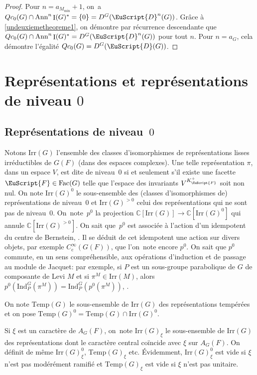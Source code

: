 \documentclass[JEP,XML,SOM,Unicode,francais]{cedram}
\let\mathcal \EuScript
\newcommand{\Ann}{\mathrm{Ann}}
\newcommand{\rc}{\mathrm{c}}
\newcommand{\Fac}{\mathrm{Fac}}
\newcommand{\Ind}{\mathrm{Ind}}
\newcommand{\Irr}{\mathrm{Irr}}
\newcommand{\Temp}{\mathrm{Temp}}
\DeclareMathOperator{\rI}{I}
\newcommand{\cD}{\mathcal{D}}
\newcommand{\cF}{\mathcal{F}}
\newcommand{\CC}{\mathbb{C}}
\theoremstyle{plain}
\theoremstyle{definition}
\begin{document}
\begin{proof}
Pour $n=a_{M_{\min}}+1$, on~a $Qc_{0}(G)\cap \Ann^n\rI(G)^*=\{0\}=D^G(\cD^n(G))$. Grâce à \eqref{undeuxiemetheoreme1}, on démontre par récurrence descendante que $Qc_{0}(G)\cap \Ann^n\rI(G)^*=D^G(\cD^n(G))$ pour tout $n$. Pour $n=a_{G}$, cela démontre l'égalité $Qc_{0}(G)=D^G(\cD(G))$.
\end{proof}

\section{Représentations et représentations de niveau \texorpdfstring{$0$}{0}}\label{representations}

\subsection{Représentations de niveau~\texorpdfstring{$0$}{0}}
Notons $\Irr(G)$ l'ensemble des classes d'isomorphismes de représentations lisses irréductibles de $G(F)$ (dans des espaces complexes). Une telle représentation $\pi$, dans un espace $V$, est dite de niveau~$0$ si et seulement s'il existe une facette $\cF\in \Fac(G)$ telle que l'espace des invariants $V^{K_{\cF}^+}$ soit non nul. On note $\Irr(G)^0$ le sous-ensemble des (classes d'isomorphismes de) représentations de niveau~$0$ et $\Irr(G)^{>0}$ celui des représentations qui ne sont pas de niveau~$0$. On~note~$p^0 $ la projection $\CC[\Irr(G)]\to \CC[\Irr(G)^0]$ qui annule $\CC[\Irr(G)^{>0}]$. On sait que~$p^0$ est associée à l'action d'un idempotent du centre de Bernstein, \cf \cite[Cor.\,3.9(i)]{B}. Il se déduit de cet idempotent une action sur divers objets, par exemple $C_{\rc}^{\infty}(G(F))$, que l'on~note encore $p^0$. On sait que $p^0$ commute, en un sens compréhensible, aux opérations d'induction et de passage au module de Jacquet: par exemple, si $P$ est un sous-groupe parabolique de $G$ de composante de Levi $M$ et si $\pi^M\in \Irr(M)$, alors $p^0(\Ind_{P}^G(\pi^M))=\Ind_{P}^G(p^0(\pi^M))$, \cf \cite[Th.\,5.2]{MP}.

On note $\Temp(G)$ le sous-ensemble de $\Irr(G)$ des représentations tempérées et on pose $\Temp(G)^0=\Temp(G)\cap \Irr(G)^0$.

Si $\xi$ est un caractère de $A_{G}(F)$, on~note $\Irr(G)_{\xi}$ le sous-ensemble de $\Irr(G)$ des représentations dont le caractère central coïncide avec $\xi$ sur $A_{G}(F)$. On définit de même $\Irr(G)_{\xi}^0$, $\Temp(G)_{\xi}$ etc. Évidemment, $\Irr(G)_{\xi}^0$ est vide si $\xi$ n'est pas modérément ramifié et $\Temp(G)_{\xi}$ est vide si $\xi$ n'est pas unitaire.
\end{document}
